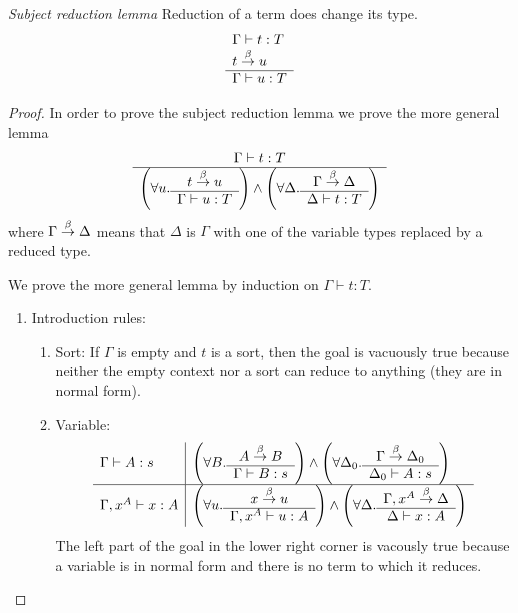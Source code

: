 \begin{theorem}
    \label{SubjectReduction}
    \emph{Subject reduction lemma} Reduction of a term does change its type.
    $$
    \begin{array}{l} 
        \Gamma \vdash t: T
        \\
        t \stackrel{\beta}{\to} u
     \\ \hline 
        \Gamma \vdash u: T
    \end{array}
    $$

    {
    \def\SRLeftPart#1#2#3#4{
        \left(
        \forall #1.
        \ruleh{#2 \reduce #1}{#3 \vdash #1: #4}
        \right)
    }
    \def\SRRightPart#1#2#3#4{
        \left(
        \forall #1.
        \ruleh{#2 \reduce #1}{#1 \vdash #3: #4}
        \right)
    }

    \begin{proof} In order to prove the subject reduction lemma we prove the
        more general lemma
        $$
        \ruleh{
            \Gamma \vdash t: T
        }
        {
            \SRLeftPart u t \Gamma T
            \land
            \SRRightPart \Delta \Gamma t T
        }
        $$
        where $\Gamma \stackrel{\beta}{\to} \Delta$ means that $\Delta$ is $\Gamma$ with one
        of the variable types replaced by a reduced type.

        We prove the more general lemma by induction on $\Gamma \vdash t: T$.
        \begin{enumerate}
            \item Introduction rules:
            \begin{enumerate}
                \item Sort: If $\Gamma$ is empty and $t$ is a sort, then the
                    goal is vacuously true because neither the empty context nor
                    a sort can reduce to anything (they are in normal form).

                \item Variable:
                    $$
                    \begin{array}{l|l}
                        \Gamma \vdash A : s
                        &
                        \SRLeftPart B A \Gamma s
                        \land
                        \SRRightPart {\Delta_0} \Gamma A s
                        \\
                        \hline
                        \Gamma, x^A \vdash x: A
                        &
                        \SRLeftPart u x {\Gamma,x^A} A
                        \land
                        \SRRightPart \Delta {\Gamma,x^A} x A
                    \end{array}
                    $$
                    The left part of the goal in the lower right corner is
                    vacously true because a variable is in normal form and there
                    is no term to which it reduces.


\end{enumerate}
\end{enumerate}
\end{proof}}
\end{theorem}
